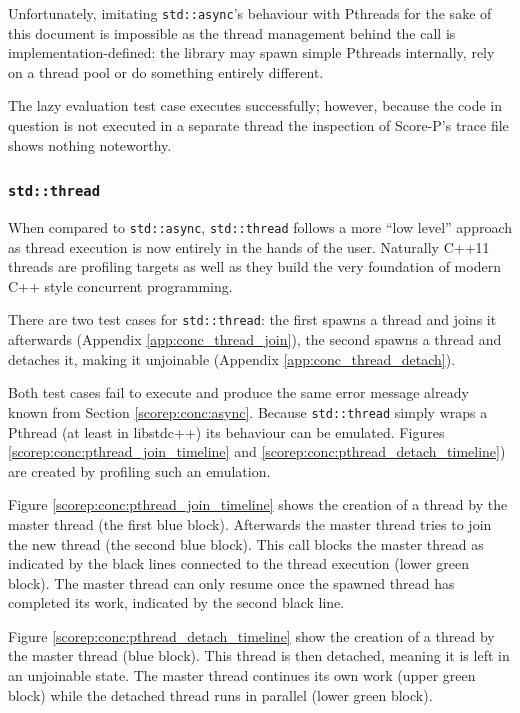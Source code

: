 Unfortunately, imitating \texttt{std::async}'s behaviour with Pthreads for the sake of this document is impossible as the thread management behind the call is implementation-defined: the library may spawn simple Pthreads internally, rely on a thread pool or do something entirely different.

The lazy evaluation test case executes successfully; however, because the code in question is not executed in a separate thread the inspection of Score-P's trace file shows nothing noteworthy.

\subsubsection{\texttt{std::thread}}\label{scorep:conc:thread}

When compared to \texttt{std::async}, \texttt{std::thread} follows a more ``low level'' approach as thread execution is now entirely in the hands of the user. Naturally C++11 threads are profiling targets as well as they build the very foundation of modern C++ style concurrent programming.

There are two test cases for \texttt{std::thread}: the first spawns a thread and joins it afterwards (Appendix \ref{app:conc_thread_join}), the second spawns a thread and detaches it, making it unjoinable (Appendix \ref{app:conc_thread_detach}).

Both test cases fail to execute and produce the same error message already known from Section \ref{scorep:conc:async}. Because \texttt{std::thread} simply wraps a Pthread (at least in libstdc++) its behaviour can be emulated. Figures \ref{scorep:conc:pthread_join_timeline} and \ref{scorep:conc:pthread_detach_timeline}) are created by profiling such an emulation.

Figure \ref{scorep:conc:pthread_join_timeline} shows the creation of a thread by the master thread (the first blue block). Afterwards the master thread tries to join the new thread (the second blue block). This call blocks the master thread as indicated by the black lines connected to the thread execution (lower green block). The master thread can only resume once the spawned thread has completed its work, indicated by the second black line.

Figure \ref{scorep:conc:pthread_detach_timeline} show the creation of a thread by the master thread (blue block). This thread is then detached, meaning it is left in an unjoinable state. The master thread continues its own work (upper green block) while the detached thread runs in parallel (lower green block).

